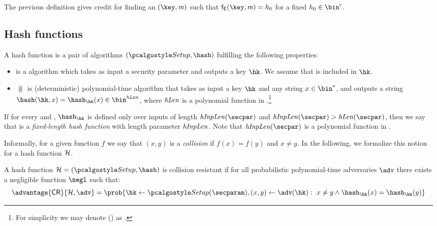 The previous definition gives credit for finding an $(\key, \msg)$ such that $\FEnc(\key, \msg) = h_0$ for a fixed $h_0 \in \bin^c$.

\subsection{Hash functions}\label{preliminaries:definitions:hash-function}

\begin{definition}
    A hash function \hashSet{} is a pair of algorithms $(\hashSetup, \hash)$ fulfilling the following properties:
    \begin{itemize}
        \item \hashSetup{} is a \ppt{} algorithm which takes as input a security parameter \secparam{} and outputs a key $\hk$. We assume that \secparam{} is included in $\hk$.
        \item $\hash$ is (deterministic) polynomial-time algorithm that takes as input a key $\hk$ and any string $x\in\bin^{*}$, and outputs a string $\hash(\hk, x) = \hash_{\hk}(x)\in\bin^{\hashLen}$, where $\mathit{hLen}$ is a polynomial function in \secpar.\footnote{For simplicity we may denote \hashLen(\secpar) as \hashLen{}.}
    \end{itemize}
    If for every \secpar{} and \hk{}, $\hash_{\hk}$ is defined only over inputs of length $\hashInpLen(\secpar)$ and $\hashInpLen(\secpar) > \hashLen(\secpar)$, then we say that \hashSet{} is a \emph{fixed-length hash function} with length parameter $\mathit{hInpLen}$. Note that $\hashInpLen(\secpar)$ is a polynomial function in \secpar.
\end{definition}

Informally, for a given function $f$ we say that $(x,y)$ is a \emph{collision} if $f(x) = f(y)$ and $x \neq y$. In the following, we formalize this notion for a hash function $\mathcal{H}$.

\begin{definition}\label{preliminaries:def:collision-resistance}
    A hash function $\hashSet = (\hashSetup, \hash)$ is collision resistant if for all probabilistic polynomial-time adversaries $\adv$ there exists a negligible function $\negl$ such that:
\[
    \advantage{\colres}{\hashSet, \adv} = \prob{
        \hk \gets \hashSetup(\secparam), (x, y) \gets \adv(\hk): \ x \neq y \land \hash_{\hk}(x) = \hash_{\hk}(y)
    }
\]
\end{definition}

